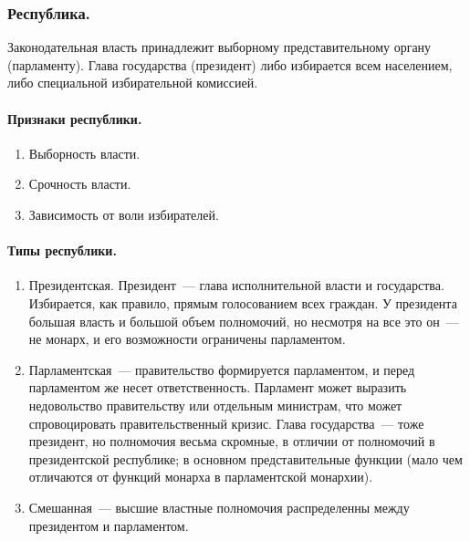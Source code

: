 \documentclass[12pt]{article}
\begin{document}
	\subsubsection{Республика.}
	\begin{definition}[Республика]
		Законодательная власть принадлежит выборному представительному органу (парламенту). Глава государства (президент) либо избирается всем населением, либо специальной избирательной комиссией.
	\end{definition}
	\paragraph{Признаки республики.}
	\begin{enumerate}
		\item Выборность власти.
		\item Срочность власти.
		\item Зависимость от воли избирателей.
	\end{enumerate}
	\paragraph{Типы республики.}
	\begin{enumerate}
		\item Президентская. Президент~--- глава исполнительной власти и государства. Избирается, как правило, прямым голосованием всех граждан. У президента большая власть и большой объем полномочий, но несмотря на все это он~--- не монарх, и его возможности ограничены парламентом.
		\item Парламентская~--- правительство формируется парламентом, и перед парламентом же несет ответственность. Парламент может выразить недовольство правительству или отдельным министрам, что может спровоцировать правительственный кризис. Глава государства~--- тоже президент, но полномочия весьма скромные, в отличии от полномочий в президентской республике; в основном представительные функции (мало чем отличаются от функций монарха в парламентской монархии).
		\item Смешанная~--- высшие властные полномочия распределенны между президентом и парламентом.
	\end{enumerate}
\end{document}
